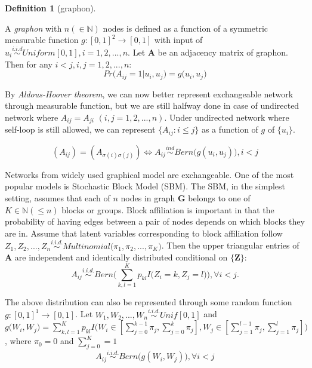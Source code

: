 \documentclass[12pt]{article}
\theoremstyle{definition}
\newtheorem{definition}{Definition}[section]
\begin{document}
\begin{definition}[graphon]
		\label{graphon}
		
		A \textit{graphon} with $n (\in \mathbb{N})$ nodes is defined as a function of a symmetric measurable function $g : [0,1]^2 \rightarrow [0,1]$ with input of $u_{i} \overset{i.i.d}{\sim} Uniform[0,1], i = 1,2,... ,n$. 
		Let $\mathbf{A}$ be an adjacency matrix of graphon. Then for any $i < j, i,j=1,2,...,n$:	
\begin{equation}
	Pr \big(   A_{ij} = 1 \big| u_{i}, u_{j} \big) = g \big(  u_{i}, u_{j} \big)
\end{equation}
\end{definition}
By \textit{Aldous-Hoover theorem}, we can now better represent exchangeable network through measurable function, but we are still halfway done in case of undirected network where $A_{ij} = A_{ji}$  $(i,j=1,2,... , n)$.  Under undirected network where self-loop is still allowed, we can represent $\{ A_{ij} : i \leq j \}$ as a function of $g$ of $\{ u_{i}\}$. 
	
\begin{equation}
( A_{ij} )  =  (   A_{\sigma(i) \sigma(j)}  ) \Longleftrightarrow A_{ij} \overset{ind}{\sim} Bern\big(  g(u_{i}, u_{j}) \big), i < j
\end{equation}  
	
Networks from widely used graphical model are exchangeable. One of the most popular models is Stochastic Block Model (SBM). 
The SBM, in the simplest setting, assumes that each of $n$ nodes in graph $\boldsymbol{G}$ belongs to one of $K \in \mathbb{N} (\leq n)$ blocks or groups. Block affiliation is important in that the probability of having edges between a pair of nodes depends on which blocks they are in.  Assume that latent variables corresponding to block affiliation follow $Z_{1}, Z_{2}, ... , Z_{n} \overset{i.i.d.}{\sim} Multinomial\big( \pi_{1}, \pi_{2}, ... , \pi_{K} \big)$. Then the upper triangular entries of $\mathbf{A}$ are independent and identically distributed conditional on $\{\mathbf{Z}\}$:
	\begin{equation} 
	A_{ij} \overset{i.i.d.}{\sim} Bern\big( \sum\limits_{k,l=1}^{K} p_{kl} I\big( Z_{i} = k, Z_{j} = l  \big)    \big), \forall  i < j.
	\end{equation}

The above distribution can also be represented through some random function $g : [0,1]^1 \rightarrow [0,1]$. Let $W_{1}, W_{2}, ... , W_{n} \overset{i.i.d.}{\sim} Unif[0,1]$ and $g\big( W_{i}, W_{j} \big) = \sum\limits_{k,l=1}^{K} p_{kl} I \big( W_{i} \in [\sum\limits_{j=0}^{k-1} \pi_{j}, \sum\limits_{j=0}^{k} \pi_{j}   ] , W_{j} \in [\sum\limits_{j=1}^{l-1} \pi_{j}, \sum\limits_{j=1}^{l} \pi_{j}  ]  \big)$, where $\pi_{0} = 0$ and $\sum\limits_{j=0}^{K} = 1$ 
\begin{equation} 
A_{ij} \overset{i.i.d.}{\sim} Bern \big( g(W_{i}, W_{j})  \big), \forall i < j
\end{equation}
\end{document}

